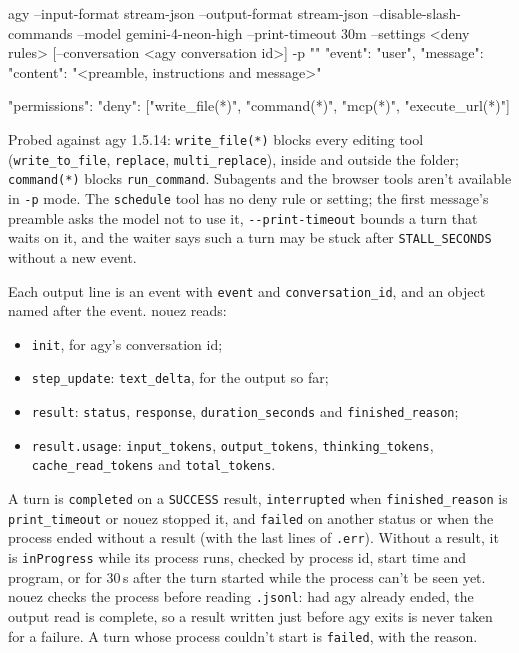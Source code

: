 \documentclass[10pt,a4paper]{article}
\newcommand{\code}[1]{\texttt{#1}}
\begin{document}
\begin{wire}
agy --input-format stream-json --output-format stream-json --disable-slash-commands
    --model gemini-4-neon-high --print-timeout 30m --settings <deny rules>
    [--conversation <agy conversation id>] -p ""
{"event": "user", "message": {"content": "<preamble, instructions and message>"}}
\end{wire}

\begin{wire}
{"permissions": {"deny": ["write_file(*)", "command(*)", "mcp(*)", "execute_url(*)"]}}
\end{wire}

Probed against agy 1.5.14: \code{write\_file(*)} blocks every editing tool (\code{write\_to\_file},
\code{replace}, \code{multi\_replace}), inside and outside the folder; \code{command(*)} blocks
\code{run\_command}. Subagents and the browser tools aren't available in \code{-p} mode. The
\code{schedule} tool has no deny rule or setting; the first message's preamble asks the model not
to use it, \code{-{}-print-timeout} bounds a turn that waits on it, and the waiter says such a
turn may be stuck after \code{STALL\_SECONDS} without a new event.

Each output line is an event with \code{event} and \code{conversation\_id}, and an object named
after the event. nouez reads:

\begin{itemize}
\item \code{init}, for agy's conversation id;
\item \code{step\_update}: \code{text\_delta}, for the output so far;
\item \code{result}: \code{status}, \code{response}, \code{duration\_seconds} and
  \code{finished\_reason};
\item \code{result.usage}: \code{input\_tokens}, \code{output\_tokens}, \code{thinking\_tokens},
  \code{cache\_read\_tokens} and \code{total\_tokens}.
\end{itemize}

A turn is
\code{completed} on a \code{SUCCESS} result, \code{interrupted} when \code{finished\_reason} is
\code{print\_timeout} or nouez stopped it, and \code{failed} on another status or when the process
ended without a result (with the last lines of \code{.err}). Without a result, it is
\code{inProgress} while its process runs, checked by process id, start time and program, or for
30\,s after the turn started while the process can't be seen yet. nouez checks the process before
reading \code{.jsonl}: had agy already ended, the output read is complete, so a result written just
before agy exits is never taken for a failure. A turn whose process couldn't start is
\code{failed}, with the reason.
\end{document}
